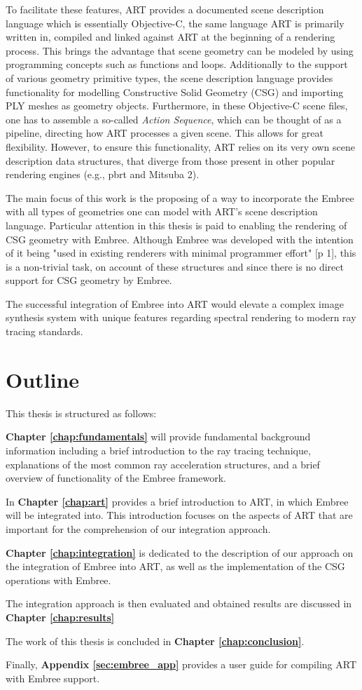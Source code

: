 To facilitate these features, ART provides a documented scene description language which is essentially Objective-C, the same language ART is primarily written in, compiled and linked against ART at the beginning of a rendering process. This brings the advantage that scene geometry can be modeled by using programming concepts   such as functions and loops. Additionally to the support of various geometry primitive types, the scene description language provides functionality for modelling Constructive Solid Geometry (CSG) and importing PLY meshes as geometry objects. Furthermore, in these Objective-C scene files, one has to assemble a so-called \emph{Action Sequence}, which can be thought of as a pipeline, directing how ART processes a given scene. 
This allows for great flexibility. However, to ensure this functionality, ART relies on its very own scene description data structures, that diverge from those present in other popular rendering engines (e.g., pbrt \cite{pharr2016physically} and Mitsuba 2).

The main focus of this work is the proposing of a way to incorporate the Embree with all types of geometries one can model with ART's scene description language. Particular attention in this thesis is paid to enabling the rendering of CSG geometry with Embree. 
Although Embree was developed with the intention of it being "used in existing renderers with minimal programmer effort" \cite{wald2014embree}[p 1], this is a non-trivial task, on account of these structures and since there is no direct support for CSG geometry by Embree.

The successful integration of Embree into ART would elevate a complex image synthesis system with unique features regarding spectral rendering to modern ray tracing standards. 


\section*{Outline}

This thesis is structured as follows: 

\textbf{Chapter \ref{chap:fundamentals}} will provide fundamental background information including a brief introduction to the ray tracing technique, explanations of the most common ray acceleration structures, and a brief overview of functionality of the Embree framework.

In \textbf{Chapter \ref{chap:art}} provides a brief introduction to ART, in which Embree will be integrated into. This introduction focuses on the aspects of ART that are important for the comprehension of our integration approach.

\textbf{Chapter \ref{chap:integration}} is dedicated to the description of our approach on the integration of Embree into ART, as well as the implementation of the CSG operations with Embree.

The integration approach is then evaluated and obtained results are discussed in \textbf{Chapter \ref{chap:results}}  

The work of this thesis is concluded in \textbf{Chapter \ref{chap:conclusion}}.

Finally, \textbf{Appendix \ref{sec:embree_app}} provides a user guide for compiling ART with Embree support.